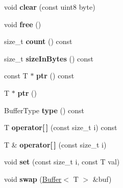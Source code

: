 \begin{DoxyCompactItemize}
void {\bfseries clear} (const uint8 byte)
\item 
\mbox{\label{class_buffer_a02179b60bb8717e231490e2d843260c4}} 
void {\bfseries free} ()
\item 
\mbox{\label{class_buffer_adef9e59af83cd013b6dfda4d95d3239f}} 
size\+\_\+t {\bfseries count} () const
\item 
\mbox{\label{class_buffer_a776c7872a2d9341b13844108bcd1ff0c}} 
size\+\_\+t {\bfseries size\+In\+Bytes} () const
\item 
\mbox{\label{class_buffer_ab881d770f9c273c36e4c8f50e63ba4c6}} 
const T $\ast$ {\bfseries ptr} () const
\item 
\mbox{\label{class_buffer_a8ad9a82901c52f4482d6af6cd0f0375b}} 
T $\ast$ {\bfseries ptr} ()
\item 
\mbox{\label{class_buffer_ac77086f411419c391242ac8f61e20a64}} 
Buffer\+Type {\bfseries type} () const
\item 
\mbox{\label{class_buffer_acc2111d9bb88a798c1d1606f3a9fb22b}} 
T {\bfseries operator\mbox{[}$\,$\mbox{]}} (const size\+\_\+t i) const
\item 
\mbox{\label{class_buffer_abd03227a6f1750607c9047a665db9c8d}} 
T \& {\bfseries operator\mbox{[}$\,$\mbox{]}} (const size\+\_\+t i)
\item 
\mbox{\label{class_buffer_ac5f4d04b2bee69fe0715e4e46bf9f65f}} 
void {\bfseries set} (const size\+\_\+t i, const T val)
\item 
\mbox{\label{class_buffer_a0fb8a098a6bc993f5e019776339e525c}} 
void {\bfseries swap} (\hyperlink{class_buffer}{Buffer}$<$ T $>$ \&buf)
\end{DoxyCompactItemize}
